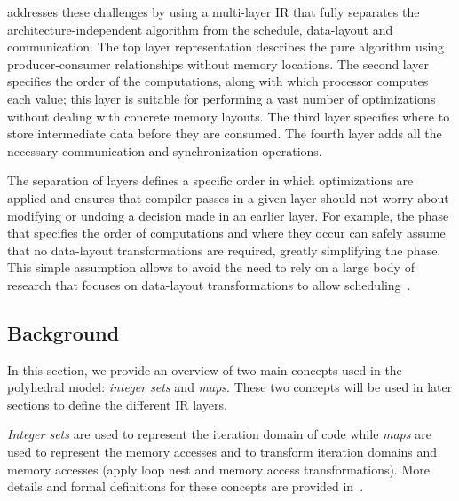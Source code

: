 \framework{} addresses these challenges by using a multi-layer IR that fully separates the architecture-independent algorithm from the schedule, data-layout and communication.
The top layer representation describes the pure algorithm using producer-consumer relationships without memory locations.
The second layer specifies the order of the computations, along with which processor computes each value; this layer is suitable for performing a vast number of optimizations without dealing with concrete memory layouts.
The third layer specifies where to store intermediate data before they are consumed.  The fourth layer adds all the necessary communication and synchronization operations.

The separation of layers defines a specific order in which optimizations are applied and ensures that compiler passes in a given layer should not worry about modifying or undoing a decision made in an earlier layer.  For example, the phase that specifies the order of computations and where they occur can safely assume that no data-layout transformations are required, greatly simplifying the phase.
This simple assumption allows \framework{} to avoid the need to rely on a large body of research that focuses on data-layout transformations to allow scheduling~\cite{gupta1997privatization,autoPrivatPeng,li_array_1992,feautrier_array_1988,midkiff_automatic_2012,maydan_array-data_1993,lefebvre_automatic_1998,Qui00,Darte_contraction_2005}.

\subsection{Background}

In this section, we provide an overview of two main concepts used in the polyhedral model: \emph{integer sets} and \emph{maps}. These two concepts will be used in later sections to define the different IR layers.

\emph{Integer sets} are used to represent the iteration domain of code while \emph{maps} are used to represent the memory accesses and to transform iteration domains and memory accesses (apply loop nest and memory access transformations).  More details and formal definitions for these concepts are provided in~\cite{verdoolaege_isl:_2010,pencil_pact,polyhedral}.

